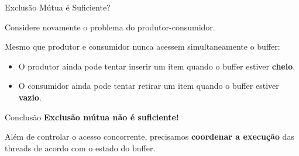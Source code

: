 \documentclass[aspectratio=169,11pt]{beamer}
\begin{document}
\begin{frame}{Exclusão Mútua é Suficiente?}

Considere novamente o problema do produtor-consumidor.

\vspace{0.4cm}

Mesmo que produtor e consumidor nunca acessem
simultaneamente o buffer:

\vspace{0.2cm}

\begin{itemize}
    \setlength{\itemsep}{0.35cm}

    \item O produtor ainda pode tentar inserir um item
    quando o buffer estiver \textbf{cheio}.

    \item O consumidor ainda pode tentar retirar um item
    quando o buffer estiver \textbf{vazio}.
\end{itemize}

\vspace{0.4cm}

\begin{alertblock}{Conclusão}
\textbf{Exclusão mútua não é suficiente!}

Além de controlar o acesso concorrente,
precisamos \textbf{coordenar a execução} das threads
de acordo com o estado do buffer.
\end{alertblock}

\end{frame}

\end{document}
